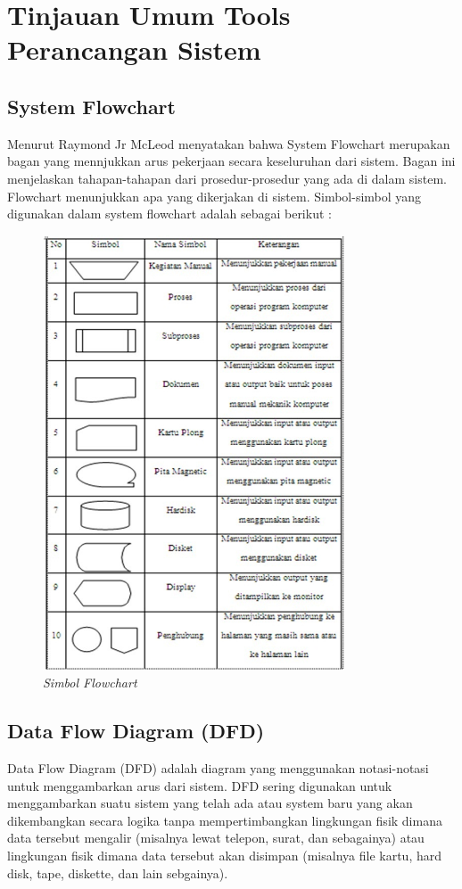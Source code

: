 \documentclass{jtetiproposalskripsi}
\begin{document}
\section{Tinjauan Umum Tools Perancangan Sistem}
\subsection{System Flowchart}
Menurut Raymond Jr McLeod menyatakan bahwa System Flowchart merupakan bagan yang mennjukkan arus pekerjaan secara keseluruhan dari sistem. Bagan ini menjelaskan tahapan-tahapan dari prosedur-prosedur yang ada di dalam sistem. Flowchart menunjukkan apa yang dikerjakan di sistem. 
\newpage
Simbol-simbol yang digunakan dalam system flowchart adalah sebagai berikut :
\begin{figure}[ht!]
\centering
\includegraphics[width=0.8\textwidth]{gambar/Simbol-Flowchart}
\caption{\textit{Simbol Flowchart}}
\label{wsn}
\end{figure}

\subsection{Data Flow Diagram (DFD)}
Data Flow Diagram (DFD) adalah diagram yang menggunakan notasi-notasi untuk menggambarkan arus dari sistem. DFD sering digunakan untuk menggambarkan suatu sistem yang telah ada atau system baru yang akan dikembangkan secara logika tanpa mempertimbangkan lingkungan fisik dimana data tersebut mengalir (misalnya lewat telepon, surat, dan sebagainya) atau lingkungan fisik dimana data tersebut akan disimpan (misalnya file kartu, hard disk, tape, diskette, dan lain sebgainya).
\end{document}
